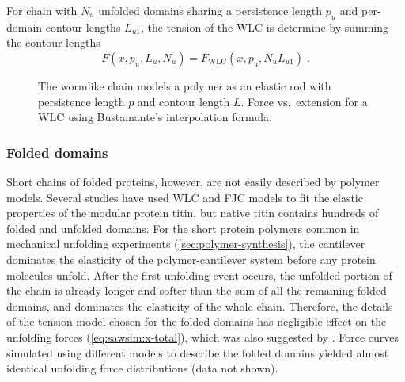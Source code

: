 For chain with $N_u$ unfolded domains sharing a persistence length
$p_u$ and per-domain contour lengths $L_{u1}$, the tension of the WLC
is determine by summing the contour lengths
\begin{equation}
  F(x, p_u, L_u, N_u) = F_\text{WLC}(x, p_u, N_u L_{u1}) \;.
  \label{eq:sawsim:multi-wlc}
\end{equation}

\begin{figure}
  \begin{center}
    \hspace{.25in}%
    \caption{\protect{} The wormlike chain models
      a polymer as an elastic rod with persistence length $p$ and
      contour length $L$.
      \protect{} Force vs.~extension for a WLC
      using Bustamante's interpolation formula.\label{fig:wlc}}
  \end{center}
\end{figure}

\subsubsection{Folded domains}
\label{sec:sawsim:tension:folded}

Short chains of folded proteins, however, are not easily described by
polymer models.  Several studies have used WLC and FJC models to fit
the elastic properties of the modular protein
titin\citep{granzier97,linke98a},
but native titin contains hundreds of folded and unfolded domains.
For the short protein polymers common in mechanical unfolding
experiments (\cref{sec:polymer-synthesis}), the cantilever dominates
the elasticity of the polymer-cantilever system before any protein
molecules unfold.  After the first unfolding event occurs, the
unfolded portion of the chain is already longer and softer than the
sum of all the remaining folded domains, and dominates the elasticity
of the whole chain.  Therefore, the details of the tension model
chosen for the folded domains has negligible effect on the unfolding
forces (\cref{eq:sawsim:x-total}), which was also suggested by
\citet{staple08}.  Force curves simulated using different models to
describe the folded domains yielded almost identical unfolding force
distributions (data not shown).%

